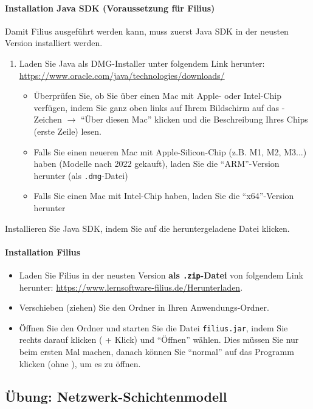 \paragraph*{Installation Java SDK (Voraussetzung für Filius)}
Damit Filius ausgeführt werden kann, muss zuerst Java SDK in der neusten Version installiert werden.
\begin{enumerate}
	\item Laden Sie Java als DMG-Installer unter folgendem Link herunter: \url{https://www.oracle.com/java/technologies/downloads/}
	      \begin{itemize}
		      \item Überprüfen Sie, ob Sie über einen Mac mit Apple- oder Intel-Chip verfügen, indem Sie ganz oben links auf Ihrem Bildschirm auf das \faApple{}-Zeichen $\rightarrow$ ``Über diesen Mac'' klicken und die Beschreibung Ihres Chips (erste Zeile) lesen.
		      \item Falls Sie einen neueren Mac mit Apple-Silicon-Chip (z.B. M1, M2, M3...) haben (Modelle nach 2022 gekauft), laden Sie die ``ARM''-Version herunter (als \texttt{.dmg}-Datei)
		      \item Falls Sie einen Mac mit Intel-Chip haben, laden Sie die ``x64''-Version herunter
	      \end{itemize}
\end{enumerate}

Installieren Sie Java SDK, indem Sie auf die heruntergeladene Datei klicken.

\paragraph*{Installation Filius}

\begin{itemize}
	\item Laden Sie Filius in der neusten Version \textbf{als \texttt{.zip}-Datei} von folgendem Link herunter: \url{https://www.lernsoftware-filius.de/Herunterladen}.
	\item Verschieben (ziehen) Sie den Ordner in Ihren Anwendungs-Ordner.
	\item Öffnen Sie den Ordner und starten Sie die Datei \texttt{filius.jar}, indem Sie rechts darauf klicken (\keys{\Alt} + Klick) und ``Öffnen'' wählen. Dies müssen Sie nur beim ersten Mal machen, danach können Sie ``normal'' auf das Programm klicken (ohne \keys{\Alt}), um es zu öffnen.
\end{itemize}

\subsection{Übung: Netzwerk-Schichtenmodell}

